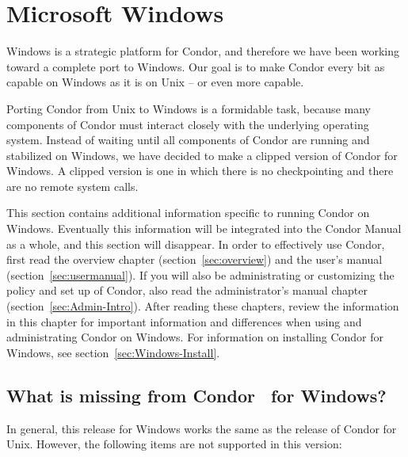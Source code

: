 \section{\label{sec:platform-windows}Microsoft Windows}

Windows is a strategic platform for Condor,
and therefore we have been working toward a complete
port to Windows.
Our goal is to make Condor every bit as capable on Windows as it is on
Unix -- or even more capable.

Porting Condor from Unix to Windows is a formidable task,
because many
components of Condor must interact closely with the underlying operating
system.
Instead of waiting until all components of Condor are running
and stabilized on Windows,
we have decided to make a clipped version of Condor for Windows.
A clipped version is one in which there is no checkpointing
and there are no remote system calls.

This section contains additional information specific to running
Condor on Windows.  Eventually this information will be integrated
into the Condor Manual as a whole, and this section will disappear.
In order to effectively use Condor, first read the overview
chapter (section~\ref{sec:overview})
and the user's manual (section~\ref{sec:usermanual}).
If you will
also be administrating or customizing the policy and set up of Condor,
also read the administrator's manual 
chapter (section~\ref{sec:Admin-Intro}).
After reading these chapters,
review the information in this chapter for
important information and differences when using and administrating
Condor on Windows.
For information on installing Condor for Windows, see
section~\ref{sec:Windows-Install}.



\subsection{What is missing from Condor \VersionNotice\ for Windows?}

In general, this release for Windows works the same as the 
release of Condor for Unix.
However, the following items are not supported in this version:

